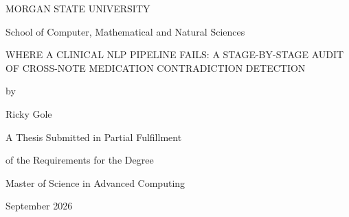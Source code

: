 \begin{frontmatterpage}
  \centering
  \singlespacing
  \thispagestyle{empty}
  \null\vfill

  MORGAN STATE UNIVERSITY\par
  \vspace{0.2in}
  School of Computer, Mathematical and Natural Sciences\par

  \vspace{0.85in}
  {\normalsize\mdseries\selectfont\MakeUppercase{Where a Clinical NLP Pipeline Fails: A Stage-by-Stage Audit of Cross-Note Medication Contradiction Detection}\par}

  \vspace{0.25in}
  by\par
  \vspace{0.2in}
  Ricky Gole\par

  \vspace{0.85in}
  A Thesis Submitted in Partial Fulfillment\par
  of the Requirements for the Degree\par
  Master of Science in Advanced Computing\par

  \vspace{0.85in}
  September 2026\par

  \vfill
\end{frontmatterpage}
